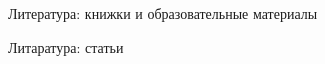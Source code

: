 \begin{frame}[allowframebreaks]{Литература: книжки и образовательные материалы}
\printbibliography[nottype=article]
\end{frame}

\begin{frame}[allowframebreaks]{Литаратура: статьи}
\printbibliography[type=article]
\end{frame}


